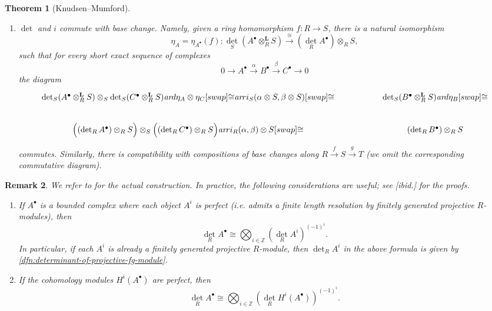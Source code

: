 \documentclass[10pt,a4paper,oneside,draft]{article}
\newcommand{\ZZ}{\mathbb{Z}}
\renewcommand{\det}{\operatorname{det}}
\newcommand{\ar}{\text{\it ar}}
\theoremstyle{myplain}
\newtheorem{theorem}{Theorem}[section]
\theoremstyle{mydefinition}
\newtheorem{remark}[theorem]{Remark}
\numberwithin{equation}{section}
\begin{document}
\begin{appendices}
\begin{theorem}[Knudsen--Mumford]
\begin{enumerate}
  \item[iii)] $\det$ and $i$ commute with base change. Namely, given a ring
    homomorphism $f\colon R\to S$, there is a natural isomorphism
    \[ \eta_A = \eta_{A^\bullet} (f)\colon
      \det_S (A^\bullet \otimes_R^\mathbf{L} S) \xrightarrow{\cong}
      (\det_R A^\bullet) \otimes_R S, \]
    such that for every short exact sequence of complexes
    \[ 0 \to A^\bullet \xrightarrow{\alpha} B^\bullet \xrightarrow{\beta}
      C^\bullet \to 0 \]
    the diagram
    \[ \begin{tikzcd}[column sep=5em]
        \det_S (A^\bullet \otimes_R^\mathbf{L} S) \otimes_S \det_S (C^\bullet \otimes_R^\mathbf{L} S) \ar{d}{\eta_A \otimes \eta_C}[swap]{\cong}\ar{r}{i_S (\alpha\otimes S, \beta\otimes S)}[swap]{\cong} & \det_S (B^\bullet \otimes_R^\mathbf{L} S) \ar{d}{\eta_B}[swap]{\cong} \\
        \Bigl((\det_R A^\bullet) \otimes_R S\Bigr) \otimes_S \Bigl((\det_R C^\bullet) \otimes_R S\Bigr) \ar{r}{i_R (\alpha,\beta) \otimes S}[swap]{\cong} & (\det_R B^\bullet) \otimes_R S
      \end{tikzcd} \]
    commutes. Similarly, there is compatibility with compositions of base
    changes along $R \xrightarrow{f} S \xrightarrow{g} T$ (we omit the
    corresponding commutative diagram).
  \end{enumerate}
\end{theorem}

\begin{remark}
  We refer to \cite{Knudsen-Mumford-1976} for the actual construction.
  In practice, the following considerations are useful; see [ibid.] for the
  proofs.

  \begin{enumerate}
  \item[1)] If $A^\bullet$ is a bounded complex where each object $A^i$ is
    perfect (i.e. admits a finite length resolution by finitely generated
    projective $R$-modules), then
    $$\det_R A^\bullet \cong \bigotimes_{i\in \ZZ} (\det_R A^i)^{(-1)^i}.$$
    In particular, if each $A^i$ is already a finitely generated projective
    $R$-module, then $\det_R A^i$ in the above formula is given by
    \ref{dfn:determinant-of-projective-fg-module}.

  \item[2)] If the cohomology modules $H^i (A^\bullet)$ are perfect, then
    \[ \det_R A^\bullet \cong
      \bigotimes_{i\in \ZZ} (\det_R H^i (A^\bullet))^{(-1)^i}. \]
  \end{enumerate}
\end{remark}


\end{appendices}
\end{document}
